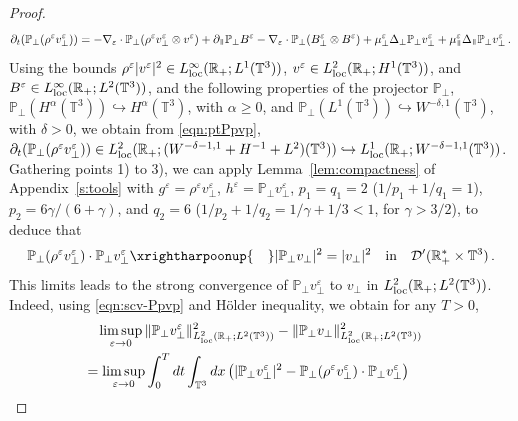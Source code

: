 \documentclass[11pt,reqno]{amsart}
\def \R{{\mathbb{R}}}
\def \T{{\mathbb{T}}}
\def \P{{\mathbb{P}}}
\newcommand{\myparallel}{{\mkern3mu\vphantom{\perp}\vrule depth 0pt\mkern2mu\vrule depth 0pt\mkern3mu}}
\begin{document}
\begin{proof}
    \begin{equation}
      \label{eqn:ptPpvp}
      \partial_t(\P_\perp(\rho^\varepsilon v_\perp^\varepsilon))=-\nabla_\varepsilon \cdot \P_\perp(\rho^\varepsilon v_\perp^\varepsilon \otimes  v^\varepsilon )
      + \partial_\myparallel \P_\perp B^\varepsilon - \nabla_\varepsilon \cdot \P_\perp(B_\perp^\varepsilon \otimes  B^\varepsilon )
      + \mu_\perp^\varepsilon \Delta_\perp \P_\perp v_\perp^\varepsilon + \mu_\myparallel^\varepsilon \Delta_\myparallel \P_\perp v_\perp^\varepsilon\,.
    \end{equation}
    Using the bounds $\rho^\varepsilon |v^\varepsilon|^2 \in L_{\rm loc}^\infty(\R_+; L^1(\T^3))$,  $v^\varepsilon\in L_{\rm loc}^2(\R_+; H^1(\T^3))$, and $B^\varepsilon \in L_{\rm loc}^\infty(\R_+ ;L^2(\T^3))$, and the following properties of the projector $\P_\perp$, $\P_\perp(H^\alpha(\T^3)) \hookrightarrow H^\alpha(\T^3)$, with $\alpha \geq 0$, and  $\P_\perp(L^1(\T^3))  \hookrightarrow W^{-\delta,1}(\T^3)$, with $\delta >0$, we obtain from \eqref{eqn:ptPpvp}, $ \partial_t(\P_\perp(\rho^\varepsilon v_\perp^\varepsilon)) \in L_{\rm loc}^2(\R_+; (W^{-\delta -1,1}+ H^{-1}+L^2)(\T^3)) \hookrightarrow  L_{\rm loc}^1(\R_+; W^{-\delta -1,1}(\T^3))$. Gathering points 1) to 3), we can apply  Lemma~\ref{lem:compactness} of Appendix~\ref{s:tools} with $g^\varepsilon =\rho^\varepsilon v_\perp^\varepsilon$,  $h^\varepsilon =\P_\perp v_\perp^\varepsilon$, $p_1=q_1=2$ ($1/p_1+1/q_1=1$), $p_2=6\gamma/(6+\gamma)$, and $q_2=6$ ($1/p_2+1/q_2=1/\gamma+1/3 < 1$, for $\gamma>3/2$), to deduce that
    \begin{equation}
      \label{eqn:scv-Ppvp}
      \P_\perp(\rho^\varepsilon v_\perp^\varepsilon) \cdot  \P_\perp v_\perp^\varepsilon \xrightharpoonup{\quad}
      |\P_\perp v_\perp|^2= | v_\perp|^2 \ \  \mbox{ \rm in } \  \ \mathcal D'(\R_+^*\times \T^3)\,.
    \end{equation}
    This limits leads to the strong convergence of $\P_\perp v_\perp^\varepsilon$ to $v_\perp$ in $L_{\rm loc}^2(\R_+; L^2(\T^3))$. Indeed, using \eqref{eqn:scv-Ppvp} and H\"older inequality, we obtain for any $T>0$,
    \begin{align*}
      \limsup_{\varepsilon \rightarrow 0} \| \P_\perp v_\perp^\varepsilon\|_{L_{\rm loc}^2(\R_+; L^2(\T^3))}^2 -
      \| \P_\perp v_\perp\|_{L_{\rm loc}^2(\R_+; L^2(\T^3))}^2 & \\
      & \hspace{-8.5cm}=
      \limsup_{\varepsilon \rightarrow 0} \int_0^Tdt \int_{\T^3} dx\, \big(| \P_\perp v_\perp^\varepsilon|^2-   \P_\perp(\rho^\varepsilon v_\perp^\varepsilon) \cdot \P_\perp v_\perp^\varepsilon \big)

\end{align*}
\end{proof}
\end{document}
